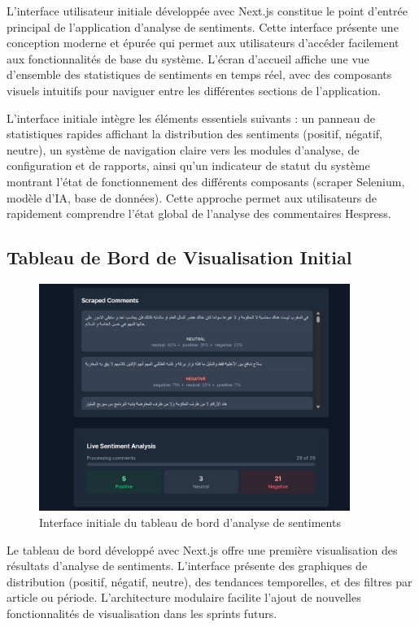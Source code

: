 L'interface utilisateur initiale développée avec Next.js constitue le point d'entrée principal de l'application d'analyse de sentiments. Cette interface présente une conception moderne et épurée qui permet aux utilisateurs d'accéder facilement aux fonctionnalités de base du système. L'écran d'accueil affiche une vue d'ensemble des statistiques de sentiments en temps réel, avec des composants visuels intuitifs pour naviguer entre les différentes sections de l'application.

L'interface initiale intègre les éléments essentiels suivants : un panneau de statistiques rapides affichant la distribution des sentiments (positif, négatif, neutre), un système de navigation claire vers les modules d'analyse, de configuration et de rapports, ainsi qu'un indicateur de statut du système montrant l'état de fonctionnement des différents composants (scraper Selenium, modèle d'IA, base de données). Cette approche permet aux utilisateurs de rapidement comprendre l'état global de l'analyse des commentaires Hespress.

\subsection{Tableau de Bord de Visualisation Initial}

\begin{figure}[H]
\centering
\includegraphics[width=0.9\textwidth]{assets/images/report-ui.png}
\caption{Interface initiale du tableau de bord d'analyse de sentiments}
\label{fig:report-ui}
\end{figure}

Le tableau de bord développé avec Next.js offre une première visualisation des résultats d'analyse de sentiments. L'interface présente des graphiques de distribution (positif, négatif, neutre), des tendances temporelles, et des filtres par article ou période. L'architecture modulaire facilite l'ajout de nouvelles fonctionnalités de visualisation dans les sprints futurs.

